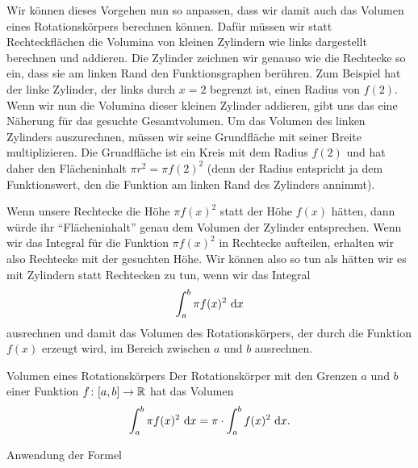 \documentclass[../../main.tex]{subfiles}
\begin{document}
\fi
Wir können dieses Vorgehen nun so anpassen, dass wir damit auch das Volumen eines Rotationskörpers berechnen können.
Dafür müssen wir statt Rechteckflächen die Volumina von kleinen Zylindern wie links dargestellt berechnen und addieren. 
Die Zylinder zeichnen wir genauso wie die Rechtecke so ein, dass sie am linken Rand den Funktionsgraphen berühren.
Zum Beispiel hat der linke Zylinder, der links durch $x=2$ begrenzt ist, einen Radius 
von $f(2)$. Wenn wir nun die Volumina dieser kleinen Zylinder addieren, gibt uns das eine Näherung für das gesuchte
Gesamtvolumen. Um das Volumen des linken Zylinders auszurechnen, müssen wir seine Grundfläche mit seiner Breite 
multiplizieren. Die Grundfläche ist ein Kreis mit dem Radius $f(2)$ und hat 
daher den Flächeninhalt $\pi r^2=\pi f(2)^2$ (denn der Radius 
entspricht ja dem Funktionswert, den die Funktion am linken Rand des Zylinders annimmt). 

Wenn unsere Rechtecke die
Höhe $\pi f(x)^2$ statt der Höhe $f(x)$ hätten, dann würde ihr \enquote{Flächeninhalt} genau dem Volumen der Zylinder 
entsprechen. Wenn wir das Integral für die Funktion $\pi f(x)^2$ in Rechtecke aufteilen, erhalten wir also Rechtecke
mit der gesuchten Höhe. Wir können also so tun als hätten wir es mit Zylindern statt Rechtecken zu tun, wenn wir das
Integral
\[\int_a^b\pi f(x)^2\mathop{}\mathrm{d} x\]
ausrechnen und damit das Volumen des Rotationskörpers, der durch die Funktion $f(x)$
erzeugt wird, im Bereich zwischen $a$ und $b$ ausrechnen.

\begin{theorem}{Volumen eines Rotationskörpers}
    Der Rotationskörper mit den Grenzen $a$ und $b$ einer Funktion $f\colon[a,b]\rightarrow\mathbb{R}$ hat das Volumen
    \[\int_a^b\pi f(x)^2\mathop{}\mathrm{d} x=\pi\cdot \int_a^bf(x)^2\mathop{}\mathrm{d} x.\]
\end{theorem}
\begin{example}{}
    Anwendung der Formel
\end{example}
\end{document}
